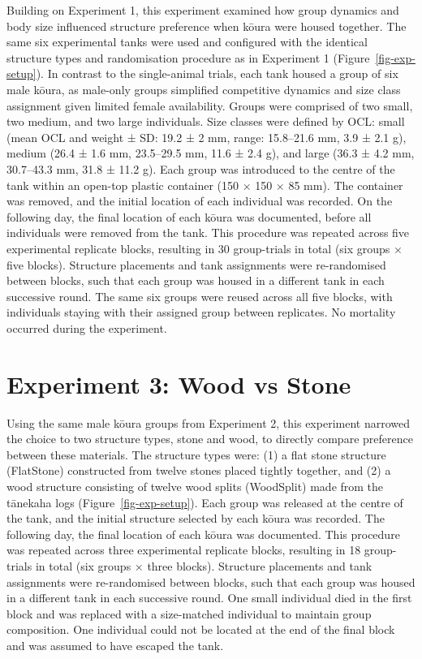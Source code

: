 \documentclass[
  12pt,
  a4paper,
]{scrbook}
\begin{document}
Building on Experiment 1, this experiment examined how group dynamics
and body size influenced structure preference when kōura were housed
together. The same six experimental tanks were used and configured with
the identical structure types and randomisation procedure as in
Experiment 1 (Figure~\ref{fig-exp-setup}). In contrast to the
single-animal trials, each tank housed a group of six male kōura, as
male-only groups simplified competitive dynamics and size class
assignment given limited female availability. Groups were comprised of
two small, two medium, and two large individuals. Size classes were
defined by OCL: small (mean OCL and weight ± SD: 19.2 ± 2 mm, range:
15.8--21.6 mm, 3.9 ± 2.1 g), medium (26.4 ± 1.6 mm, 23.5--29.5 mm, 11.6
± 2.4 g), and large (36.3 ± 4.2 mm, 30.7--43.3 mm, 31.8 ± 11.2 g). Each
group was introduced to the centre of the tank within an open-top
plastic container (150 × 150 × 85 mm). The container was removed, and
the initial location of each individual was recorded. On the following
day, the final location of each kōura was documented, before all
individuals were removed from the tank. This procedure was repeated
across five experimental replicate blocks, resulting in 30 group-trials
in total (six groups × five blocks). Structure placements and tank
assignments were re-randomised between blocks, such that each group was
housed in a different tank in each successive round. The same six groups
were reused across all five blocks, with individuals staying with their
assigned group between replicates. No mortality occurred during the
experiment.

\section{Experiment 3: Wood vs Stone}\label{experiment-3-wood-vs-stone}

Using the same male kōura groups from Experiment 2, this experiment
narrowed the choice to two structure types, stone and wood, to directly
compare preference between these materials. The structure types were:
(1) a flat stone structure (FlatStone) constructed from twelve stones
placed tightly together, and (2) a wood structure consisting of twelve
wood splits (WoodSplit) made from the tānekaha logs
(Figure~\ref{fig-exp-setup}). Each group was released at the centre of
the tank, and the initial structure selected by each kōura was recorded.
The following day, the final location of each kōura was documented. This
procedure was repeated across three experimental replicate blocks,
resulting in 18 group-trials in total (six groups × three blocks).
Structure placements and tank assignments were re-randomised between
blocks, such that each group was housed in a different tank in each
successive round. One small individual died in the first block and was
replaced with a size-matched individual to maintain group composition.
One individual could not be located at the end of the final block and
was assumed to have escaped the tank.
\end{document}
